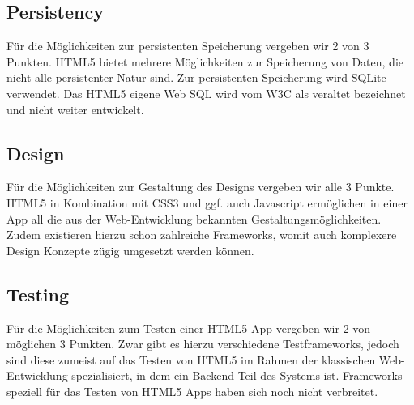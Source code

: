 \subsection{Persistency}
Für die Möglichkeiten zur persistenten Speicherung vergeben wir 2 von 3 Punkten. HTML5 bietet mehrere Möglichkeiten zur Speicherung von Daten, die nicht alle persistenter Natur sind. Zur persistenten Speicherung wird SQLite verwendet. Das HTML5 eigene Web SQL wird vom W3C als veraltet bezeichnet und nicht weiter entwickelt.

\subsection{Design}
Für die Möglichkeiten zur Gestaltung des Designs vergeben wir alle 3 Punkte. HTML5 in Kombination mit CSS3 und ggf. auch Javascript ermöglichen in einer App all die aus der Web-Entwicklung bekannten Gestaltungsmöglichkeiten. Zudem existieren hierzu schon zahlreiche Frameworks, womit auch komplexere Design Konzepte zügig umgesetzt werden können.

\subsection{Testing}
Für die Möglichkeiten zum Testen einer HTML5 App vergeben wir 2 von möglichen 3 Punkten. Zwar gibt es hierzu verschiedene Testframeworks, jedoch sind diese zumeist auf das Testen von HTML5 im Rahmen der klassischen Web-Entwicklung spezialisiert, in dem ein Backend Teil des Systems ist. Frameworks speziell für das Testen von HTML5 Apps haben sich noch nicht verbreitet.
